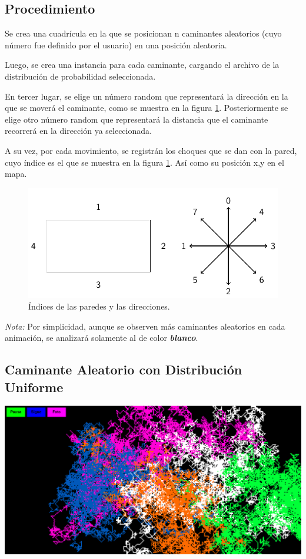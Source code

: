 \documentclass[11pt]{article} %
\begin{document}
	\subsection{Procedimiento}
	
	Se crea una cuadrícula en la que se posicionan n caminantes aleatorios (cuyo número fue definido por el usuario) en una posición aleatoria.
	
	Luego, se crea una instancia para cada caminante, cargando el archivo de la distribución de probabilidad seleccionada.
	
	En tercer lugar, se elige un número random que representará la dirección en la que se moverá el caminante, como se muestra en la figura \ref{fig:dir-paredes}. Posteriormente se elige otro número random que representará la distancia que el caminante recorrerá en la dirección ya seleccionada.
	
	A su vez, por cada movimiento, se registrán los choques que se dan con la pared, cuyo índice es el que se muestra en la figura \ref{fig:dir-paredes}. Así como su posición x,y en el mapa.
	
		\begin{figure}[h]
			\centering
			\includegraphics[width=0.6\linewidth]{rectangulo.png}
			\caption{Índices de las paredes y las direcciones.}
			\label{fig:dir-paredes}
		\end{figure}
	
	
	\textit{Nota:} Por simplicidad, aunque se observen más caminantes aleatorios en cada animación, se analizará solamente al de color \textbf{\textit{blanco}}.
	
	 \subsection{Caminante Aleatorio con Distribución Uniforme}
	 
	 \begin{center}
	 	\includegraphics[width=0.8\linewidth]{walkerUniforme.png}
	 	\label{walkerUniforme}
	 \end{center}
	 
\end{document}
